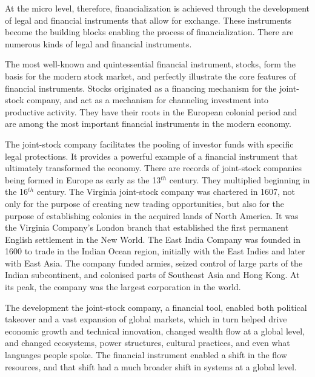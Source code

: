 At the micro level, therefore, financialization is achieved through the development of legal and financial instruments that allow for exchange. These instruments become the building blocks enabling the process of financialization. There are numerous kinds of legal and financial instruments.

The most well-known and quintessential financial instrument, stocks, form the basis for the modern stock market, and perfectly illustrate the core features of financial instruments. %
Stocks originated as a financing mechanism for the \gls{joint-stock company}, and act as a %
mechanism for channeling investment into productive activity. They have their roots in the European colonial period and are among the most important financial instruments in the modern economy. %

The joint-stock company %
facilitates the pooling of investor funds with specific legal protections. It provides a powerful example of a financial instrument that ultimately transformed the economy. There are records of joint-stock companies being formed in Europe as early as the 13$^{th}$ century. They multiplied beginning in the 16$^{th}$ century. The Virginia joint-stock company was chartered in 1607, not only for the purpose of creating new trading opportunities, but also for the purpose of establishing colonies in the acquired lands of North America.  It was the Virginia Company's London branch that established the first permanent English settlement in the New World. The East India Company was founded in 1600 to trade in the Indian Ocean region, initially with the East Indies and later with East Asia. The company funded armies, seized control of large parts of the Indian subcontinent, and colonised parts of Southeast Asia and Hong Kong. At its peak, the company was the largest corporation in the world. 

The development the joint-stock company, a financial tool, enabled both political takeover and a vast expansion of global markets, which in turn helped drive economic growth and technical innovation, changed wealth flow at a global level, and changed ecosystems, power structures, cultural practices, and even what languages people spoke. The financial instrument enabled a shift in the flow resources, and that shift had a much broader shift in systems at a global level. %

